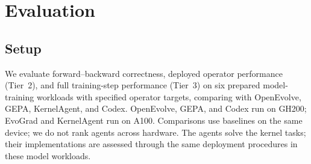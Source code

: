 \section{Evaluation}
\label{sec:results}

\subsection{Setup}
\label{sec:experimental_setup}

We evaluate forward--backward correctness, deployed operator performance (Tier~2), and full training-step performance (Tier~3) on six prepared model-training workloads with specified operator targets, comparing \method with OpenEvolve, GEPA, KernelAgent, and Codex. OpenEvolve, GEPA, and Codex run on GH200; EvoGrad and KernelAgent run on A100. Comparisons use baselines on the same device; we do not rank agents across hardware. The agents solve the kernel tasks; their implementations are assessed through the same deployment procedures in these model workloads.


